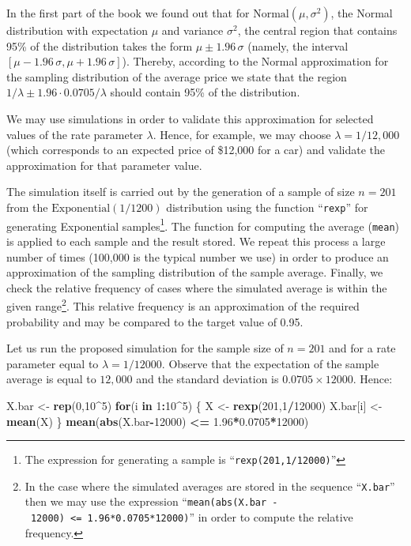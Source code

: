 \documentclass[]{krantz}
\makeatletter
\newenvironment{Shaded}{\begin{snugshade}}{\end{snugshade}}
\newcommand{\KeywordTok}[1]{\textcolor[rgb]{0.13,0.29,0.53}{\textbf{#1}}}
\newcommand{\DecValTok}[1]{\textcolor[rgb]{0.00,0.00,0.81}{#1}}
\newcommand{\FloatTok}[1]{\textcolor[rgb]{0.00,0.00,0.81}{#1}}
\newcommand{\StringTok}[1]{\textcolor[rgb]{0.31,0.60,0.02}{#1}}
\newcommand{\ControlFlowTok}[1]{\textcolor[rgb]{0.13,0.29,0.53}{\textbf{#1}}}
\newcommand{\OperatorTok}[1]{\textcolor[rgb]{0.81,0.36,0.00}{\textbf{#1}}}
\newcommand{\NormalTok}[1]{#1}
\newenvironment{kframe}{%
\medskip{}
\setlength{\fboxsep}{.8em}
 \def\at@end@of@kframe{}%
 \ifinner\ifhmode%
  \def\at@end@of@kframe{\end{minipage}}%
  \begin{minipage}{\columnwidth}%
 \fi\fi%
 \def\FrameCommand##1{\hskip\@totalleftmargin \hskip-\fboxsep
 \colorbox{shadecolor}{##1}\hskip-\fboxsep
     \hskip-\linewidth \hskip-\@totalleftmargin \hskip\columnwidth}%
 \MakeFramed {\advance\hsize-\width
   \@totalleftmargin\z@ \linewidth\hsize
   \@setminipage}}%
 {\par\unskip\endMakeFramed%
 \at@end@of@kframe}
\renewenvironment{Shaded}{\begin{kframe}}{\end{kframe}}
\theoremstyle{definition}
\theoremstyle{definition}
\theoremstyle{definition}
\theoremstyle{remark}
\makeatother
\begin{document}
In the first part of the book we found out that for
\(\mathrm{Normal}(\mu,\sigma^2)\), the Normal distribution with
expectation \(\mu\) and variance \(\sigma^2\), the central region that
contains 95\% of the distribution takes the form
\(\mu \pm 1.96\, \sigma\) (namely, the interval
\([\mu-1.96\,\sigma,\mu + 1.96\, \sigma]\)). Thereby, according to the
Normal approximation for the sampling distribution of the average price
we state that the region \(1/\lambda \pm 1.96 \cdot 0.0705/\lambda\)
should contain 95\% of the distribution.

We may use simulations in order to validate this approximation for
selected values of the rate parameter \(\lambda\). Hence, for example,
we may choose \(\lambda = 1/12,000\) (which corresponds to an expected
price of \$12,000 for a car) and validate the approximation for that
parameter value.

The simulation itself is carried out by the generation of a sample of
size \(n=201\) from the \(\mathrm{Exponential}(1/1200)\) distribution
using the function ``\texttt{rexp}'' for generating Exponential
samples\footnote{The expression for generating a sample is
  ``\texttt{rexp(201,1/12000)}''}. The function for computing the
average (\texttt{mean}) is applied to each sample and the result stored.
We repeat this process a large number of times (100,000 is the typical
number we use) in order to produce an approximation of the sampling
distribution of the sample average. Finally, we check the relative
frequency of cases where the simulated average is within the given
range\footnote{In the case where the simulated averages are stored in
  the sequence ``\texttt{X.bar}'' then we may use the expression
  ``\texttt{mean(abs(X.bar\ -\ 12000)\ \textless{}=\ 1.96*0.0705*12000)}''
  in order to compute the relative frequency.}. This relative frequency
is an approximation of the required probability and may be compared to
the target value of 0.95.

Let us run the proposed simulation for the sample size of \(n=201\) and
for a rate parameter equal to \(\lambda = 1/12000\). Observe that the
expectation of the sample average is equal to \(12,000\) and the
standard deviation is \(0.0705\times 12000\). Hence:

\begin{Shaded}
\begin{Highlighting}[]
\NormalTok{X.bar <-}\StringTok{ }\KeywordTok{rep}\NormalTok{(}\DecValTok{0}\NormalTok{,}\DecValTok{10}\OperatorTok{^}\DecValTok{5}\NormalTok{)}
\ControlFlowTok{for}\NormalTok{(i }\ControlFlowTok{in} \DecValTok{1}\OperatorTok{:}\DecValTok{10}\OperatorTok{^}\DecValTok{5}\NormalTok{) \{}
\NormalTok{  X <-}\StringTok{ }\KeywordTok{rexp}\NormalTok{(}\DecValTok{201}\NormalTok{,}\DecValTok{1}\OperatorTok{/}\DecValTok{12000}\NormalTok{)}
\NormalTok{  X.bar[i] <-}\StringTok{ }\KeywordTok{mean}\NormalTok{(X)}
\NormalTok{\}}
\KeywordTok{mean}\NormalTok{(}\KeywordTok{abs}\NormalTok{(X.bar}\OperatorTok{-}\DecValTok{12000}\NormalTok{) }\OperatorTok{<=}\StringTok{ }\FloatTok{1.96}\OperatorTok{*}\FloatTok{0.0705}\OperatorTok{*}\DecValTok{12000}\NormalTok{)}
\end{Highlighting}
\end{Shaded}
\end{document}
